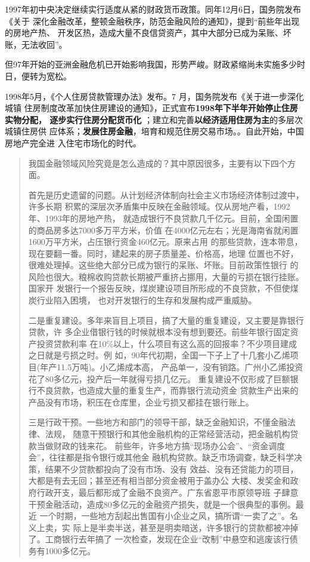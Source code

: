 1997年初中央决定继续实行适度从紧的财政货币政策。同年12月6日，国务院发布《关于
深化金融改革，整顿金融秩序，防范金融风险的通知》，提到“前些年出现的房地产热、
开发区热，造成大量不良信贷资产，其中大部分已成为呆账、坏账，无法收回”。

但97年开始的亚洲金融危机已开始影响我国，形势严峻。财政紧缩尚未实施多少时日，便转为宽松。


1998年5月，《个人住房贷款管理办法》发布。7 月，国务院发布《关于进一步深化城镇
住房制度改革加快住房建设的通知》，正式宣布\textbf{1998年下半年开始停止住房实物分配，
  逐步实行住房分配货币化} ；建立和完善\textbf{以经济适用住房为主}的多层次城镇住房供
应体系；\textbf{发展住房金融}，培育和规范住房交易市场。。自此开始，中国房地产完全进
入住宅市场化的时代。


\begin{quotation}
  我国金融领域风险究竟是怎么造成的？其中原因很多，主要有以下四个方面。

  首先是历史遗留的问题。从计划经济体制向社会主义市场经济体制过渡中，许多长期
  积累的深层次矛盾集中反映在金融领域。仅从房地产看，1992年、1993年的房地产热，
  就造成银行不良贷款几千亿元。目前，全国闲置的商品房多达7000多万平方米，价值
  在4000亿元左右；光是海南省就闲置1600万平方米，占压银行资金460亿元。原来占用
  的那些贷款，连本带息，现在要翻一番。同时，建起来的房子质量差、价格高，地理
  位置也不好，很难处理掉。这些绝大部分已成为银行的呆账、坏账。目前政策性银行
  的风险也很大。粮棉收购贷款长期被严重挤占挪用，大量的亏损在银行挂账。国家开
  发银行一个报告反映，煤炭建设项目所形成的不良贷款，不但使煤炭行业陷入困境，
  也对开发银行的生存和发展构成严重威胁。

  二是重复建设。多年来盲目上项目，搞了大量的重复建设，又主要是靠银行贷款，许
  多企业借银行钱的时候就根本没有想到要还。前些年银行固定资产投资贷款利率
  在10\%以上，什么项目有这么高的回报率？不少项目建成之日就是亏损之时。例
  如，90年代初期，全国一下子上了十几套小乙烯项目(年产11.5万吨)。小乙烯成本高，
  产品单一，没有销路。广州小乙烯投资花了80多亿元，投产后一年就得亏损几亿元。
  重复建设不仅形成了巨额银行不良贷款，也造成大量的重复生产，而靠银行流动资金
  贷款生产出来的产品没有市场，积压在仓库里，企业亏损又都挂在银行账上。

  三是行政干预。一些地方和部门的领导干部，缺乏金融知识，不懂金融法律、法规，
  随意干预银行和其他金融机构的正常经营活动，把金融机构贷款当做财政的钱来花。
  前些年，许多地方搞“现场办公会”、“资金调度会”，往往都是指令银行或其他金
  融机构贷款。缺乏市场调查，缺乏科学决策，结果不少贷款都投向了没有市场、没有
  效益、没有还贷能力的项目，大都是有去无回；甚至还有相当部分资金被用于盖办公
  大楼、发奖金和政府行政开支，最后都形成了金融不良资产。广东省恩平市原领导班
  子肆意干预金融活动，造成80多亿元的金融资产损失，就是一个很典型的事例。最近
  一个时期，一些地方刮起出售国有小企业之风，搞所谓“一卖了之”。名义上卖，实
  际上是半卖半送，甚至是明卖暗送，许多银行的贷款都被冲掉了。工商银行去年搞了
  一次检查，发现在企业“改制”中悬空和逃废该行债务有1000多亿元。


\end{quotation}
